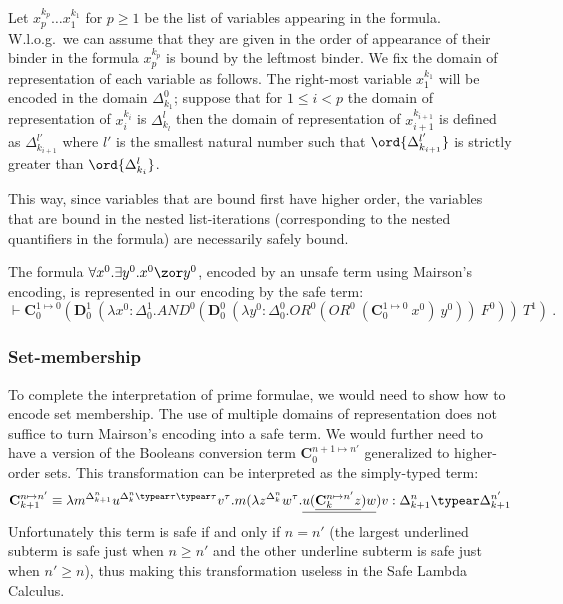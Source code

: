 Let $x^{k_p}_p \ldots x^{k_1}_1$ for $p\geq1$ be the list of variables appearing in the formula. W.l.o.g.\ we can assume that they are given in the order of appearance of their binder in the formula \ie $x^{k_p}_p$ is bound by the leftmost binder. We fix the domain of representation of each variable as follows. The right-most variable $x^{k_1}_1$ will be encoded in the domain $\Delta^0_{k_1}$; suppose that for $1\leq i< p$ the domain of representation of $x^{k_i}_i$ is $\Delta^l_{k_l}$ then the domain of representation of $x^{k_{i+1}}_{i+1}$ is defined as
$\Delta^{l'}_{k_{i+1}}$ where $l'$ is the smallest natural number such that $\ord{\Delta^{l'}_{k_{i+1}}}$ is strictly greater than $\ord{\Delta^{l}_{k_i}}$.

This way, since variables that are bound first have higher order, the variables that are bound in the nested list-iterations (corresponding to the nested quantifiers in the formula) are necessarily safely bound.

\begin{example}
The formula  $\forall x^0 . \exists y^0 . x^0 \zor y^0$, encoded by an unsafe term using Mairson's encoding, is represented in our encoding by the safe term:
 $$\vdash \mathbf{C}_0^{1\mapsto 0} \left( \mathbf{D}_0^1~(\lambda x^0:\Delta_0^1. AND^0 ( \mathbf{D}_0^0 ~(\lambda y^0:\Delta_0^0. OR^0 (OR^0~(\mathbf{C}_0^{1\mapsto 0}~x^0)~y^0))~F^0))~T^1 \right)\ .$$
\end{example}


\subsubsection{Set-membership}
To complete the interpretation of prime formulae, we would need to show how to encode set membership. The use of multiple domains of representation does not suffice to turn Mairson's encoding into a safe term. We would further need to have a version of the Booleans conversion term $\mathbf{C}^{n+1\mapsto n'}_0$ generalized to higher-order sets.
This transformation can be interpreted as the simply-typed term:
$$ \mathbf{C}^{n\mapsto n'}_{k+1} \equiv \lambda m^{\Delta_{k+1}^n} u^{\Delta_k^n\typear \tau\typear \tau} v^\tau. m (\lambda z^{\Delta_k^n} w^\tau . \underline{u (\underline{\mathbf{C}^{n\mapsto n'}_k z}) w}) v : \Delta_{k+1}^n \typear \Delta_{k+1}^{n'}$$
Unfortunately this term is safe if and only if $n=n'$ (the largest underlined subterm is safe just when $n\geq n'$ and the other underline subterm is safe just when $n'\geq n$), thus making this transformation useless in the Safe Lambda Calculus.

